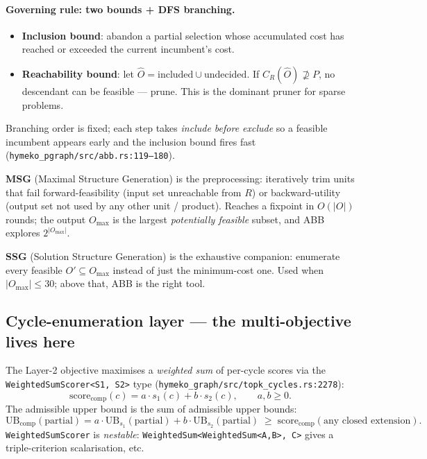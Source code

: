\documentclass[11pt,a4paper]{article}
\newcommand{\code}[1]{\texttt{\small #1}}
\begin{document}
\paragraph{Governing rule: two bounds + DFS branching.}
\begin{itemize}
\item \textbf{Inclusion bound}: abandon a partial selection whose
      accumulated cost has reached or exceeded the current
      incumbent's cost.
\item \textbf{Reachability bound}: let
      $\widehat{O} = \text{included} \cup \text{undecided}$. If
      $C_R(\widehat{O}) \not\supseteq P$, no descendant can be
      feasible --- prune. This is the dominant pruner for sparse
      problems.
\end{itemize}
Branching order is fixed; each step takes \emph{include before exclude}
so a feasible incumbent appears early and the inclusion bound fires
fast (\code{hymeko\_pgraph/src/abb.rs:119--180}).

\textbf{MSG} (Maximal Structure Generation) is the preprocessing: iteratively
trim units that fail forward-feasibility (input set unreachable from
$R$) or backward-utility (output set not used by any other unit /
product). Reaches a fixpoint in $O(|O|)$ rounds; the output $O_{\max}$
is the largest \emph{potentially feasible} subset, and ABB explores
$2^{|O_{\max}|}$.

\textbf{SSG} (Solution Structure Generation) is the exhaustive companion:
enumerate every feasible $O' \subseteq O_{\max}$ instead of just the
minimum-cost one. Used when $|O_{\max}| \leq 30$; above that, ABB is
the right tool.

\subsection{Cycle-enumeration layer --- the multi-objective lives here}

The Layer-2 objective maximises a \emph{weighted sum} of per-cycle scores
via the \code{WeightedSumScorer<S1, S2>} type
(\code{hymeko\_graph/src/topk\_cycles.rs:2278}):
\[
\boxed{\;\mathrm{score}_{\mathrm{comp}}(c) = a \cdot s_1(c) + b \cdot s_2(c),
\qquad a, b \geq 0.\;}
\]
The admissible upper bound is the sum of admissible upper bounds:
\[
\mathrm{UB}_{\mathrm{comp}}(\text{partial})
   = a \cdot \mathrm{UB}_{s_1}(\text{partial})
   + b \cdot \mathrm{UB}_{s_2}(\text{partial})
   \;\geq\; \mathrm{score}_{\mathrm{comp}}(\text{any closed extension}).
\]
\code{WeightedSumScorer} is \emph{nestable}: \code{WeightedSum<WeightedSum<A,B>, C>}
gives a triple-criterion scalarisation, etc.
\end{document}
